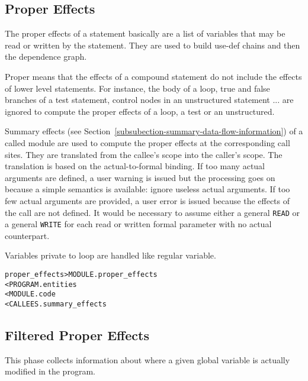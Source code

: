 \documentclass[a4paper]{report}
\newenvironment{PipsMake}{\begin{alltt}}{\end{alltt}}
\begin{document}
\subsection{Proper Effects}
\label{subsubsection-proper-effects}

The proper effects of a statement basically are a list of variables
that may be read or written by the statement. They are used to build use-def
chains and then the dependence graph.

Proper means that the effects of a compound statement do not include the
effects of lower level statements. For instance, the body of a loop, true and
false branches of a test statement, control nodes in an unstructured
statement ... are ignored to compute the proper effects of a loop, a
test or an unstructured.

Summary effects (see
Section~\ref{subsubection-summary-data-flow-information}) of a called
module are used to compute the proper effects at the corresponding
call sites. They are translated from the callee's scope into the
caller's scope. The translation is based on the actual-to-formal
binding. If too many actual arguments are defined, a user warning is
issued but the processing goes on because a simple semantics is
available: ignore useless actual arguments. If too few actual
arguments are provided, a user error is issued because the effects of
the call are not defined. It would be necessary to assume either a
general \verb+READ+ or a general \verb+WRITE+ for each read or written
formal parameter with no actual counterpart.

Variables private to loop are handled like regular variable.

\begin{PipsMake}
proper_effects                  > MODULE.proper_effects
        < PROGRAM.entities
        < MODULE.code
        < CALLEES.summary_effects
\end{PipsMake}


\subsection{Filtered Proper Effects}
\label{subsubsection-filtered-proper-effects}

This phase collects information about where a given global variable is
actually modified in the program.
\end{document}
